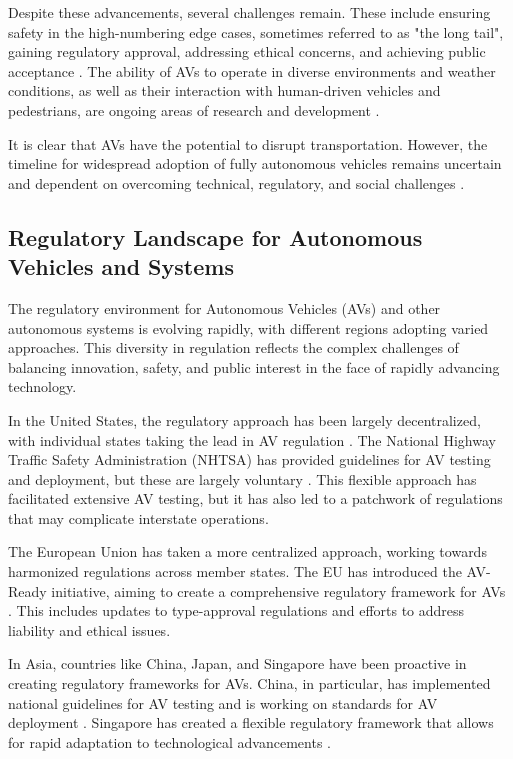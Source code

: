 Despite these advancements, several challenges remain. These include ensuring safety in the high-numbering edge cases, sometimes referred to as "the long tail", gaining regulatory approval, addressing ethical concerns, and achieving public acceptance \cite{Koopman2019}. The ability of AVs to operate in diverse environments and weather conditions, as well as their interaction with human-driven vehicles and pedestrians, are ongoing areas of research and development \cite{Yurtsever2020}.

It is clear that AVs have the potential to disrupt transportation. However, the timeline for widespread adoption of fully autonomous vehicles remains uncertain and dependent on overcoming technical, regulatory, and social challenges \cite{Litman2023}.

\subsection{Regulatory Landscape for Autonomous Vehicles and Systems}

The regulatory environment for Autonomous Vehicles (AVs) and other autonomous systems is evolving rapidly, with different regions adopting varied approaches. This diversity in regulation reflects the complex challenges of balancing innovation, safety, and public interest in the face of rapidly advancing technology.

In the United States, the regulatory approach has been largely decentralized, with individual states taking the lead in AV regulation \cite{Claybrook2018}. %
The National Highway Traffic Safety Administration (NHTSA) has provided guidelines for AV testing and deployment, but these are largely voluntary \cite{nhtsa2020}. This flexible approach has facilitated extensive AV testing, but it has also led to a patchwork of regulations that may complicate interstate operations.

The European Union has taken a more centralized approach, working towards harmonized regulations across member states. The EU has introduced the AV-Ready initiative, aiming to create a comprehensive regulatory framework for AVs \cite{EuropeanCommission2020}. This includes updates to type-approval regulations and efforts to address liability and ethical issues.

In Asia, countries like China, Japan, and Singapore have been proactive in creating regulatory frameworks for AVs. China, in particular, has implemented national guidelines for AV testing and is working on standards for AV deployment \cite{Du2020}. Singapore has created a flexible regulatory framework that allows for rapid adaptation to technological advancements \cite{Taeihagh2019}.

